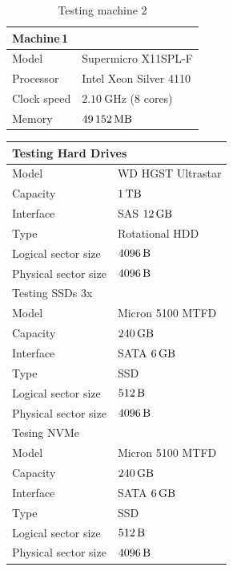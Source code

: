 \documentclass[
  color, %
  table, %
  lof,   %
  lot,   %
]{fithesis3}
\begin{document}
\begin{table}
\centering
\begin{tabular}{|l|l|}
\hline
   \multicolumn{2}{|l|}{Machine\,1} \\ \hline %
    Model & Supermicro X11SPL-F\\
    \hline
    Processor & Intel Xeon Silver 4110  \\
    \hline
    Clock speed & $\SI{2.10}{\giga\hertz}$ (8 cores) \\
    \hline
    Memory & $\SI{49152}{\mega\byte}$ \\
    \hline
\end{tabular}
\caption{Testing machine 2}
\end{table}


\begin{table}
\centering
\begin{tabular}{|l|l|}
\hline
   \multicolumn{2}{|l|}{Testing Hard Drives} \\ \hline %
    Model & WD HGST Ultrastar\\
    \hline
    Capacity & $\SI{1}{\tera\byte}$  \\
    \hline
    Interface & SAS $\SI{12}{\giga\byte}$  \\
    \hline
    Type & Rotational HDD \\
    \hline    
    Logical sector size & $\SI{4096}{\byte}$ \\    
    \hline    
    Physical sector size & $\SI{4096}{\byte}$ \\
    \hline
    \hline
    \multicolumn{2}{|l|}{Testing SSDs 3x } \\ \hline %
     Model & Micron 5100 MTFD \\
    \hline
     Capacity & $\SI{240}{\giga\byte}$  \\
    \hline
    Interface & SATA $\SI{6}{\giga\byte}$  \\
    \hline
    Type & SSD \\
    \hline    
    Logical sector size & $\SI{512}{\byte}$ \\    
    \hline    
     Physical sector size & $\SI{4096}{\byte}$ \\
    \hline

    \hline
    \multicolumn{2}{|l|}{Tesing NVMe} \\ \hline %
     Model & Micron 5100 MTFD \\
    \hline
     Capacity & $\SI{240}{\giga\byte}$  \\
    \hline
    Interface & SATA $\SI{6}{\giga\byte}$  \\
    \hline
    Type & SSD \\
    \hline    
    Logical sector size & $\SI{512}{\byte}$ \\    
    \hline    
     Physical sector size & $\SI{4096}{\byte}$ \\


\end{tabular}
\end{table}
\end{document}
